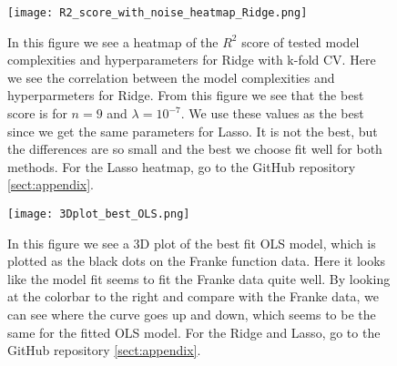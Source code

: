 \documentclass[12pt,a4paper,english]{article}
\begin{document}
\begin{figure}[htbp]
	\centering\texttt{[image: R2\_score\_with\_noise\_heatmap\_Ridge.png]}
	\caption{In this figure we see a heatmap of the $R^2$ score of tested model complexities and hyperparameters for Ridge with k-fold CV. Here we see the correlation between the model complexities and hyperparmeters for Ridge. From this figure we see that the best score is for $n=9$ and $\lambda=10^{-7}$. We use these values as the best since we get the same parameters for Lasso. It is not the best, but the differences are so small and the best we choose fit well for both methods. For the Lasso heatmap, go to the GitHub repository \ref{sect:appendix}. \label{fig:heatmap_ridge}}
\end{figure}

\begin{figure}[htbp]
	\centering\texttt{[image: 3Dplot\_best\_OLS.png]}
	\caption{In this figure we see a 3D plot of the best fit OLS model, which is plotted as the black dots on the Franke function data. Here it looks like the model fit seems to fit the Franke data quite well. By looking at the colorbar to the right and compare with the Franke data, we can see where the curve goes up and down, which seems to be the same for the fitted OLS model. For the Ridge and Lasso, go to the GitHub repository \ref{sect:appendix}. \label{fig:best_3d_OLS}}
\end{figure}
\end{document}
